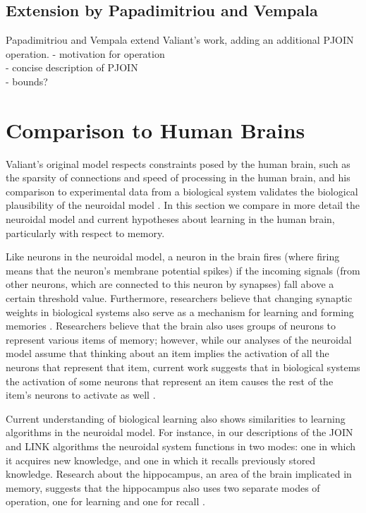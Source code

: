 \documentclass[letterpaper, 12pt]{article}
\begin{document}
\subsection{Extension by Papadimitriou and Vempala}\label{sec:pjoin}
Papadimitriou and Vempala \cite{papadimitriou_cortical_2015} extend Valiant's work, adding an additional PJOIN operation.
- motivation for operation\\
- concise description of PJOIN\\
- bounds?\\

\section{Comparison to Human Brains}
Valiant's original model respects constraints posed by the human brain, such as the sparsity of connections and speed of processing in the human brain, and his comparison to experimental data from a biological system validates the biological plausibility of the neuroidal model \cite{valiant_quantitative_2006}. In this section we compare in more detail the neuroidal model and current hypotheses about learning in the human brain, particularly with respect to memory.

Like neurons in the neuroidal model, a neuron in the brain fires (where firing means that the neuron's membrane potential spikes) if the incoming signals (from other neurons, which are connected to this neuron by synapses) fall above a certain threshold value. Furthermore, researchers believe that changing synaptic weights in biological systems also serve as a mechanism for learning and forming memories \cite{cooper_donald_2005}. Researchers believe that the brain also uses groups of neurons to represent various items of memory; however, while our analyses of the neuroidal model assume that thinking about an item implies the activation of all the neurons that represent that item, current work suggests that in biological systems the activation of some neurons that represent an item causes the rest of the item's neurons to activate as well \cite{schacter_richard_1978}.

Current understanding of biological learning also shows similarities to learning algorithms in the neuroidal model. For instance, in our descriptions of the JOIN and LINK algorithms the neuroidal system functions in two modes: one in which it acquires new knowledge, and one in which it recalls previously stored knowledge. Research about the hippocampus, an area of the brain implicated in memory, suggests that the hippocampus also uses two separate modes of operation, one for learning and one for recall \cite{treves_computational_1992}.
\end{document}
